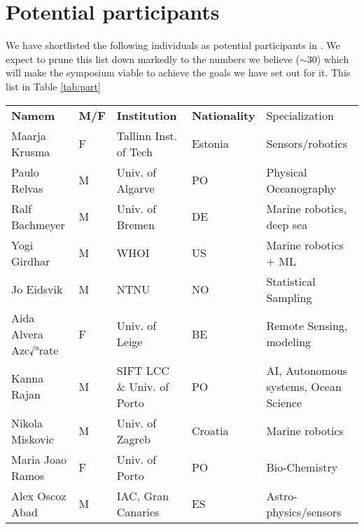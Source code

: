 \section{Potential participants}
\label{sec:part}

We have shortlisted the following individuals as potential participants
in \sympe. We expect to prune this list down markedly to the numbers we
believe ($\sim 30$) which will make the symposium viable to achieve the
goals we have set out for it. This list in Table \ref{tab:part}

\begin{table}[]
  \footnotesize{
\begin{tabular}{|p{3cm}|p{0.5cm}|p{3.5cm}|p{1cm}|p{4cm}|}
  \rowcolor{Gray}
  \bfseries Namem& \bfseries M/F&\bfseries Institution & \bfseries Nationality& Specialization\\
Maarja Krusma            & F   & Tallinn Inst. of Tech                 & Estonia  & Sensors/robotics                                \\
  \hline
Paulo Relvas             & M   & Univ. of Algarve                      & PO       & Physical Oceanography                           \\
\hline
Ralf Bachmeyer           & M   & Univ. of Bremen                       & DE       & Marine robotics, deep sea                       \\
\hline
Yogi Girdhar             & M   & WHOI                                  & US       & Marine robotics + ML                            \\
\hline
Jo Eidsvik               & M   & NTNU                                  & NO       & Statistical Sampling                            \\
\hline
Aida Alvera Azc√°rate    & F   & Univ. of Leige                        & BE       & Remote Sensing, modeling                        \\
\hline
Kanna Rajan              & M   & SIFT LCC \& Univ. of Porto            & PO       & AI, Autonomous systems, Ocean Science           \\
\hline
Nikola Miskovic          & M   & Univ. of Zagreb                       & Croatia  & Marine robotics                                 \\
\hline
Maria Joao Ramos         & F   & Univ. of Porto                        & PO       & Bio-Chemistry                                   \\
\hline
Alex Oscoz Abad          & M   & IAC, Gran Canaries                    & ES       & Astro-physics/sensors                           \\

\end{tabular}}
\end{table}
